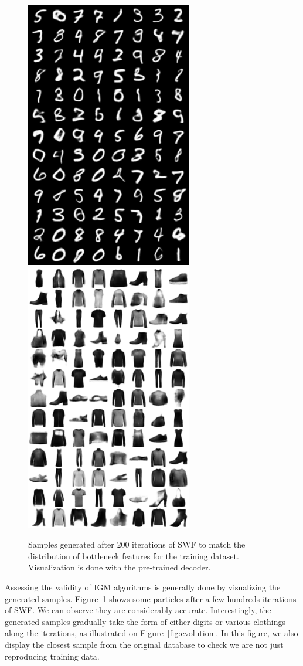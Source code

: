 \begin{figure}
\centering
\includegraphics[width=0.45\columnwidth]{figures/MNIST_train_image_1000.png}
\includegraphics[width=0.45\columnwidth]{figures/FashionMNIST_train_image_1000.png}
\label{fig:samples}
\caption{Samples generated after 200 iterations of SWF to match the distribution of bottleneck features for the training dataset. Visualization is done with the pre-trained decoder.}
\end{figure}


Assessing the validity of IGM algorithms is generally done by visualizing the generated samples. Figure~\ref{fig:samples} shows some particles after a few hundreds iterations of SWF. We can observe they are considerably accurate. Interestingly, the generated samples gradually take the form of either digits or various clothings along the iterations, as illustrated on Figure~\ref{fig:evolution}. In this figure, we also display the closest sample from the original database to check we are not just reproducing training data.


